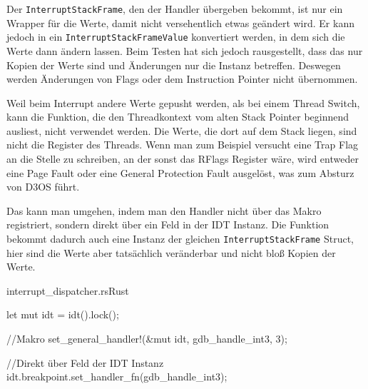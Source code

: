 Der \texttt{InterruptStackFrame}, den der Handler übergeben bekommt, ist nur ein Wrapper für die Werte, damit nicht versehentlich etwas geändert wird. Er kann jedoch in ein \texttt{InterruptStackFrameValue} konvertiert werden, in dem sich die Werte dann ändern lassen. Beim Testen hat sich jedoch rausgestellt, dass das nur Kopien der Werte sind und Änderungen nur die Instanz betreffen. Deswegen werden Änderungen von Flags oder dem Instruction Pointer nicht übernommen.

Weil beim Interrupt andere Werte gepusht werden, als bei einem Thread Switch, kann die Funktion, die den Threadkontext vom alten Stack Pointer beginnend ausliest, nicht verwendet werden. Die Werte, die dort auf dem Stack liegen, sind nicht die Register des Threads. Wenn man zum Beispiel versucht eine Trap Flag an die Stelle zu schreiben, an der sonst das RFlags Register wäre, wird entweder eine Page Fault oder eine General Protection Fault ausgelöst, was zum Absturz von D3OS führt.

Das kann man umgehen, indem man den Handler nicht über das Makro registriert, sondern direkt über ein Feld in der IDT Instanz. Die Funktion bekommt dadurch auch eine Instanz der gleichen \texttt{InterruptStackFrame} Struct, hier sind die Werte aber tatsächlich veränderbar und nicht bloß Kopien der Werte.

\begin{codeblock}{interrupt\_dispatcher.rs}{Rust}
\begin{rustcode}
let mut idt = idt().lock();

//Makro
set_general_handler!(&mut idt, gdb_handle_int3, 3);

//Direkt über Feld der IDT Instanz
idt.breakpoint.set_handler_fn(gdb_handle_int3);
\end{rustcode}
\end{codeblock}

